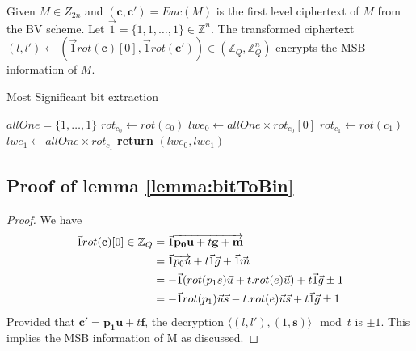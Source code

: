 \begin{lemma}\label{lemma:bitToBin}
	Given $M \in Z_{2n}$ and $(\mathbf{c},\mathbf{c'}) = Enc(M)$ is the first level ciphertext of $M$ from the BV scheme. Let $\vec{1} = \{1,1,\dots,1\} \in \mathbb{Z}^n$. The transformed ciphertext $(l, l') \leftarrow (\vec{1}
	rot({\mathbf{c}})[0], \vec{1}
	rot({\mathbf{c'}})) \in (\mathbb{Z}_Q
	, \mathbb{Z}_Q^n)$ encrypts the MSB information of $M$.
\end{lemma}

\begin{algorithm}
  \caption{Most Significant bit extraction}\label{alg:MSBExtract}
  \begin{algorithmic}[1]
    \State $allOne = \{1,\dots,1\}$
    \State $rot_{c_0} \gets rot(c_0)$
    \State $lwe_0 \gets allOne \times rot_{c_0}[0]$
    \State $rot_{c_1} \gets rot(c_1)$
    \State $lwe_1 \gets allOne \times rot_{c_1}$
    \State \textbf{return} $(lwe_0,lwe_1)$
    \EndProcedure
  \end{algorithmic}
\end{algorithm}


\subsection{Proof of lemma \ref{lemma:bitToBin}}
\label{append:proofHom}
 \begin{proof}
	We have\\
	\begin{align*}
	\vec{1}rot(\mathbf{c})[0] \in \mathbb{Z}_Q &= \vec{1}\overrightarrow{
		\mathbf{p_0}\mathbf{u} + t\mathbf{g} + \mathbf{m}}\\
	&= \vec{1}\overrightarrow{p_0u} +t\vec{1}\vec{g} +\vec{1}\vec{m}\\
	&= -\vec{1}(rot(p_1s)\vec{u} +t.rot(e)\vec{u}) + t\vec{1}\vec{g} \pm1\\
	&= -\vec{1}rot(p_1)\vec{u}\vec{s} - t.rot(e)\vec{u}\vec{s} + t\vec{1}\vec{g} \pm1\\
	\end{align*}
	Provided that $\mathbf{c'} = \mathbf{p_1}\mathbf{u} + t\mathbf{f}$, the decryption $\langle(l,l'),(1,\mathbf{s})\rangle \mod t$ is $\pm1$.
	This implies the MSB information of M as discussed.
\end{proof}

